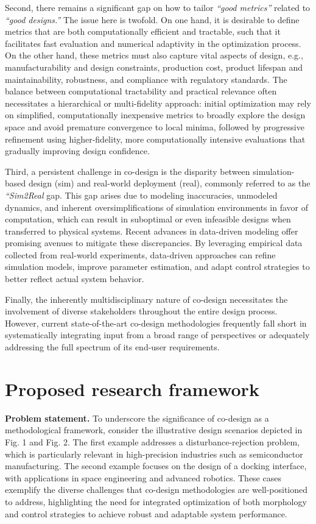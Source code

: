 Second, there remains a significant gap on how to tailor \emph{``good
metrics''} related to \emph{``good designs.''} The issue here is
twofold. On one hand, it is desirable to define metrics that are both
computationally efficient and tractable, such that it facilitates fast
evaluation and numerical adaptivity in the optimization process. On the
other hand, these metrics must also capture vital aspects of design,
e.g., manufacturability and design constraints, production cost, product
lifespan and maintainability, robustness, and compliance with regulatory
standards. The balance between computational tractability and practical
relevance often necessitates a hierarchical or multi-fidelity approach:
initial optimization may rely on simplified, computationally inexpensive
metrics to broadly explore the design space and avoid premature
convergence to local minima, followed by progressive refinement using
higher-fidelity, more computationally intensive evaluations that
gradually improving design confidence.

Third, a persistent challenge in co-design is the disparity between
simulation-based design (sim) and real-world deployment (real), commonly
referred to as the \emph{``Sim2Real} gap. This gap arises due to
modeling inaccuracies, unmodeled dynamics, and inherent
oversimplifications of simulation environments in favor of computation,
which can result in suboptimal or even infeasible designs when
transferred to physical systems. Recent advances in data-driven modeling
offer promising avenues to mitigate these discrepancies. By leveraging
empirical data collected from real-world experiments, data-driven
approaches can refine simulation models, improve parameter estimation,
and adapt control strategies to better reflect actual system behavior.

Finally, the inherently multidisciplinary nature of co-design
necessitates the involvement of diverse stakeholders throughout the
entire design process. However, current state-of-the-art co-design
methodologies frequently fall short in systematically integrating input
from a broad range of perspectives or adequately addressing the full
spectrum of its end-user requirements.

\section*{\textbf{Proposed research framework}}

\textbf{Problem statement.} To underscore the significance of co-design
as a methodological framework, consider the illustrative design
scenarios depicted in Fig. 1 and Fig. 2. The first example addresses a
disturbance-rejection problem, which is particularly relevant in
high-precision industries such as semiconductor manufacturing. The
second example focuses on the design of a docking interface, with
applications in space engineering and advanced robotics. These cases
exemplify the diverse challenges that co-design methodologies are
well-positioned to address, highlighting the need for integrated
optimization of both morphology and control strategies to achieve robust
and adaptable system performance.

